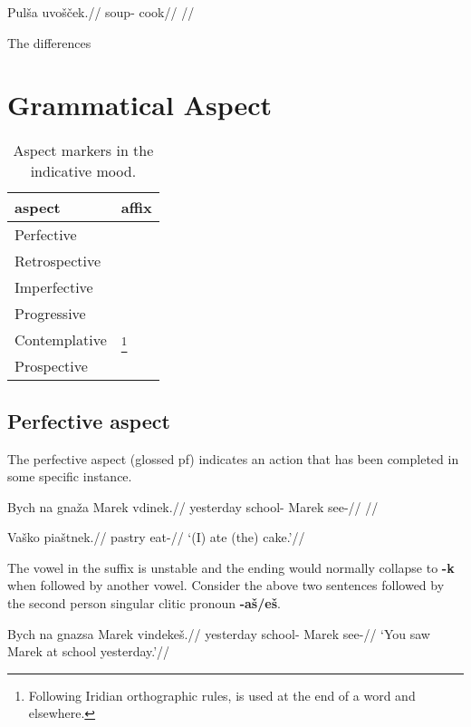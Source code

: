 \pex
\begingl
\gla Pul\v{s}a uvo\v{s}\v{c}ek.//
\glb soup- cook//
\glft {}//
\endgl
\xe


\par The differences

\section{Grammatical Aspect}
\begin{table}[h!]
	\footnotesize\sffamily
	\caption{Aspect markers in the indicative mood.}
	\begin{tabu} to 0.5\textwidth{YY[0.5]}
		\toprule
		{\sc aspect}	& {\sc affix}\\
		\midrule
		Perfective		& \\
		Retrospective	& \\
		Imperfective	& \\
		Progressive		&  \\
		Contemplative	& \footnote{Following Iridian orthographic rules,  is used at the end of a word and  elsewhere.}\\
		Prospective		& \\
		\bottomrule
	\end{tabu}

\end{table}
\subsection{Perfective aspect}
The perfective aspect (glossed {\sc pf}) indicates an action that has been completed in some specific instance.

\pex
\begingl
\gla Bych na gna\v{z}a Marek vdinek.//
\glb yesterday  school- Marek see-//
\glft {}//
\endgl
\xe

\pex
\begingl
\gla Va\v{s}ko pia\v{s}tnek.//
\glb pastry eat-//
\glft `(I) ate (the) cake.'//
\endgl
\xe

\par The vowel in the suffix is unstable and the ending would normally collapse to \textbf{-k} when followed by another vowel. Consider the above two sentences followed by the second person singular clitic pronoun \textbf{-a\v{s}/e\v{s}}.

\pex
\begingl
\gla Bych na gnazsa Marek vindeke\v{s}.//
\glb yesterday  school- Marek see-//
\glft `You saw Marek at school yesterday.'//
\endgl
\xe

